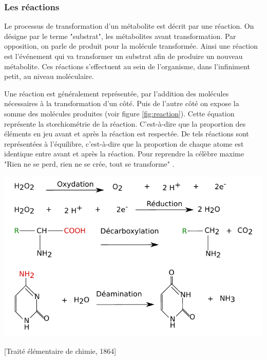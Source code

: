 \begin{refsegment}

	\subsubsection{Les réactions}
	Le processus de transformation d’un métabolite est décrit par une réaction. On désigne par le terme "substrat", les métabolites avant transformation. Par opposition, on parle de produit pour la molécule transformée. Ainsi une réaction est l'événement qui va transformer un substrat afin de produire un nouveau métabolite. Ces réactions s'effectuent au sein de l'organisme, dans l'infiniment petit, au niveau moléculaire.
    
    Une réaction est généralement représentée, par l’addition des molécules nécessaires à la transformation d’un côté. Puis de l’autre côté on expose la somme des molécules produites (voir figure \ref{fig:reaction}). Cette équation  représente la stœchiométrie de la réaction. C’est-à-dire que la proportion des éléments en jeu avant et après la réaction est respectée. De tels réactions sont représentées à l'équilibre, c'est-à-dire que la proportion de chaque atome est identique entre avant et après la réaction. Pour reprendre la célèbre maxime "Rien ne se perd, rien ne se crée, tout se transforme" .
    
    \begin{shadedfigure}
        \centering
        \includegraphics[width=\textwidth]{img/equation_reaction.pdf}
        \caption{Représentation de réaction sous leur forme "équation-bilan" .}
        \label{fig:reaction}
    \end{shadedfigure}
    
    [Traité élémentaire de chimie, 1864]
    

\end{refsegment}
